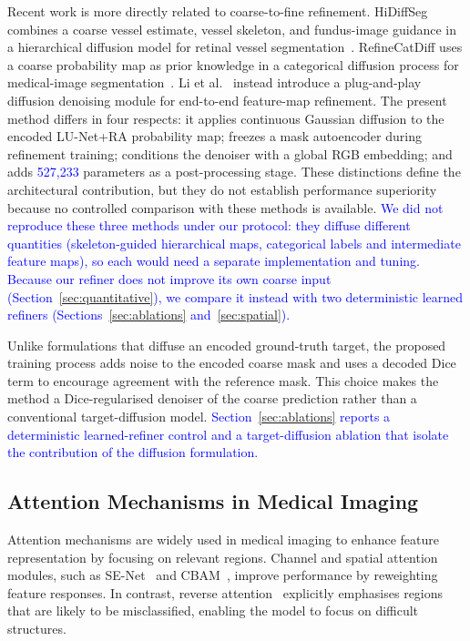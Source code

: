 \documentclass[jimaging,article,submit,pdftex,moreauthors]
  {Definitions/mdpi}
\DeclareRobustCommand{\rev}[1]{\textcolor{blue}{#1}}
\DeclareRobustCommand{\rev}[1]{#1}
\providecommand{\linelabel}[1]{}
\newcommand{\secend}[1]{\linelabel{rev:end:#1}}
\begin{document}
Recent work is more directly related to coarse-to-fine refinement. HiDiffSeg combines a coarse vessel estimate, vessel skeleton, and fundus-image guidance in a hierarchical diffusion model for retinal vessel segmentation~\cite{HiDiffSeg}. RefineCatDiff uses a coarse probability map as prior knowledge in a categorical diffusion process for medical-image segmentation~\cite{RefineCatDiff}. Li et al.~\cite{DiffusionFMD} instead introduce a plug-and-play diffusion denoising module for end-to-end feature-map refinement. The present method differs in four respects: it applies continuous Gaussian diffusion to the encoded LU-Net+RA probability map; freezes a mask autoencoder during refinement training; conditions the denoiser with a global RGB embedding; and adds \rev{527,233} parameters as a post-processing stage. These distinctions define the architectural contribution, but they do not establish performance superiority because no controlled comparison with these methods is available. \rev{We did not reproduce these three methods under our protocol: they diffuse different quantities (skeleton-guided hierarchical maps, categorical labels and intermediate feature maps), so each would need a separate implementation and tuning. Because our refiner does not improve its own coarse input (Section~\ref{sec:quantitative}), we compare it instead with two deterministic learned refiners (Sections~\ref{sec:ablations} and~\ref{sec:spatial}).}

Unlike formulations that diffuse an encoded ground-truth target, the proposed training process adds noise to the encoded coarse mask and uses a decoded Dice term to encourage agreement with the reference mask. This choice makes the method a Dice-regularised denoiser of the coarse prediction rather than a conventional target-diffusion model. \rev{Section~\ref{sec:ablations} reports a deterministic learned-refiner control and a target-diffusion ablation that isolate the contribution of the diffusion formulation.}\secend{related}

\subsection{Attention Mechanisms in Medical Imaging}

Attention mechanisms are widely used in medical imaging to enhance feature representation by focusing on relevant regions. Channel and spatial attention modules, such as SE-Net~\cite{Hu2018} and CBAM~\cite{Woo2018}, improve performance by reweighting feature responses. In contrast, reverse attention~\cite{Hernandez2025} explicitly emphasises regions that are likely to be misclassified, enabling the model to focus on difficult structures.
\end{document}

